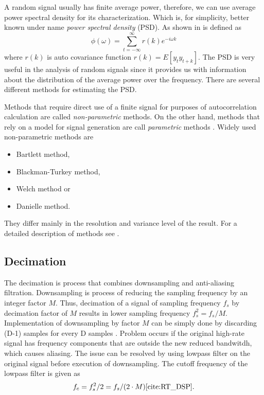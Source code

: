 \documentclass[twoside]{ctuthesis}
\theoremstyle{plain}
\theoremstyle{definition}
\theoremstyle{note}
\begin{document}
A random signal usually has finite average power, therefore, we can use average power spectral density for its characterization. Which is, for simplicity, better known under name \textit{power spectral density} (PSD). As shown in \cite{cite:SAoS} is defined as
\begin{equation} \label{eq:PSD1}
\phi(\omega) = \sum_{t=-\infty}^{\infty}r(k)e^{-i\omega k}
\end{equation}
where $r(k)$ is auto covariance function $r(k) = E[y_{t}y_{t+k}]$.
The PSD is very useful in the analysis of random signals since it provides us with information about the distribution of the average power over the frequency. There are several different methods for estimating the PSD. 

Methods that require direct use of a finite signal for purposes of autocorrelation calculation are called \textit{non-parametric} methods. On the other hand, methods that rely on a model for signal generation are call \textit{parametric} methods \cite{cite:RT_DSP}. Widely used non-parametric methods are

\begin{itemize}
	\setlength{\itemsep}{5pt}
\item Bartlett method,
\item Blackman-Turkey method,
\item Welch method or
\item Danielle method.
\end{itemize}

They differ mainly in the resolution and variance level of the result. For a detailed description of methods see \cite{cite:2}.

\subsection{Decimation}
The decimation is process that combines downsampling and anti-aliasing filtration. Downsampling is process of reducing the sampling frequency by an integer factor $M$. Thus, decimation of a signal of sampling frequency $f_s$ by decimation factor of $M$ results in lower sampling frequency ${f_s^{2}=f_s/M}$. Implementation of downsampling by factor $M$ can be simply done by discarding (D-1) samples for every D samples \cite{cite:2}. 
Problem occurs if the original high-rate signal has frequency components that are outside the new reduced bandwitdh, which causes aliasing. The issue can be resolved by using lowpass filter on the original signal before execution of downsampling. The cutoff frequency of the lowpass filter is given as
\begin{equation} \label{eq:decimation}
f_c=f_s^{2}/2=f_s/(2\cdot M) \cite{cite:RT_DSP}.
\end{equation}
\end{document}

